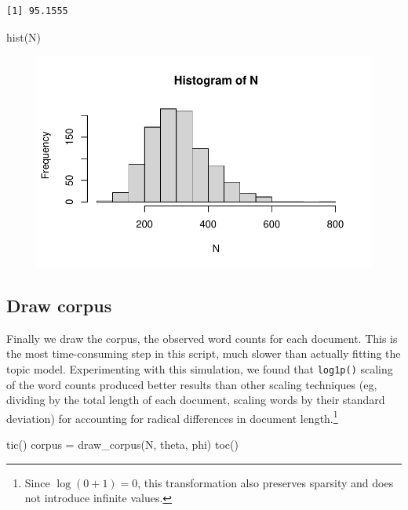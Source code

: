 \documentclass[
]{article}
\newenvironment{Shaded}{\begin{snugshade}}{\end{snugshade}}
\newcommand{\FunctionTok}[1]{\textcolor[rgb]{0.28,0.35,0.67}{#1}}
\newcommand{\NormalTok}[1]{\textcolor[rgb]{0.00,0.23,0.31}{#1}}
\newcommand{\OtherTok}[1]{\textcolor[rgb]{0.00,0.23,0.31}{#1}}
\begin{document}
\begin{verbatim}
[1] 95.1555
\end{verbatim}

\begin{Shaded}
\begin{Highlighting}[]
\FunctionTok{hist}\NormalTok{(N)}
\end{Highlighting}
\end{Shaded}

\begin{figure}[H]

{\centering \includegraphics{paper_files/figure-pdf/unnamed-chunk-7-1.pdf}

}

\end{figure}

\hypertarget{draw-corpus}{%
\subsection{Draw corpus}\label{draw-corpus}}

Finally we draw the corpus, the observed word counts for each document.
This is the most time-consuming step in this script, much slower than
actually fitting the topic model. Experimenting with this simulation, we
found that \texttt{log1p()} scaling of the word counts produced better
results than other scaling techniques (eg, dividing by the total length
of each document, scaling words by their standard deviation) for
accounting for radical differences in document length.\footnote{Since
  \(\log(0+1) = 0\), this transformation also preserves sparsity and
  does not introduce infinite values.}

\begin{Shaded}
\begin{Highlighting}[]
\FunctionTok{tic}\NormalTok{()}
\NormalTok{corpus }\OtherTok{=} \FunctionTok{draw\_corpus}\NormalTok{(N, theta, phi)}
\FunctionTok{toc}\NormalTok{()}
\end{Highlighting}
\end{Shaded}
\end{document}
